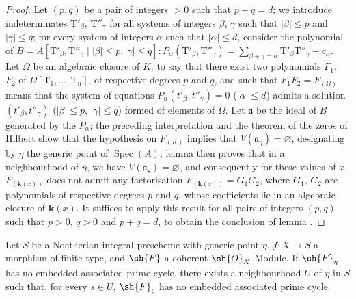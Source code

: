 \begin{proof}
Let $(p,q)$ be a pair of integers $>0$ such that $p+q=d$; we introduce indeterminates $\mathrm{T}'_\beta$, $\mathrm{T}''_\gamma$ for all systems of integers $\beta$, $\gamma$ such that $|\beta|\leqslant p$ and $|\gamma|\leqslant q$; for every system of integers $\alpha$ such that $|\alpha|\leqslant d$, consider the polynomial of $B=A[\mathrm{T}'_\beta, \mathrm{T}''_\gamma \mid |\beta|\leqslant p, |\gamma|\leqslant q]: P_\alpha(\mathrm{T}'_\beta,\mathrm{T}''_\gamma)=\sum_{\beta+\gamma=\alpha}\mathrm{T}'_\beta \mathrm{T}''_\gamma-c_\alpha$.
Let $\Omega$ be an algebraic closure of $K$; to say that there exist two polynomials $F_1$, $F_2$ of $\Omega[\mathrm{T}_1,\ldots,\mathrm{T}_n]$, of respective degrees $p$ and $q$, and such that $F_1 F_2=F_{(\Omega)}$ means that the system of equations $P_\alpha(t'_\beta,t''_\gamma)=0$ ($|\alpha|\leqslant d$) admits a solution $(t'_\beta,t''_\gamma)$ ($|\beta|\leqslant p$, $|\gamma|\leqslant q$) formed of elements of $\Omega$.
Let $\mathfrak{a}$ be the ideal of $B$ generated by the $P_\alpha$; the preceding interpretation and the theorem of the zeros of Hilbert show that the hypothesis on $F_{(K)}$ implies that $V(\mathfrak{a}_\eta)=\varnothing$, designating by $\eta$ the generic point of $\operatorname{Spec}(A)$; lemma  then proves that in a neighbourhood of $\eta$, we have $V(\mathfrak{a}_s)=\varnothing$, and consequently for these values of $x$, $F_{(\boldsymbol{k}(x))}$ does not admit any factorisation $F_{(\boldsymbol{k}(x))}=G_1 G_2$, where $G_1$, $G_2$ are polynomials of respective degrees $p$ and $q$, whose coefficients lie in an algebraic closure of $\boldsymbol{k}(x)$.
It suffices to apply this result for all pairs of integers $(p,q)$ such that $p>0$, $q>0$ and $p+q=d$, to obtain the conclusion of lemma .
\end{proof}

\begin{proposition}[9.7.6]
\label{IV.9.7.6}
Let $S$ be a Noetherian integral prescheme with generic point $\eta$, $f:X\to S$ a morphism of finite type, and $\sh{F}$ a coherent $\sh{O}_X$-Module.
If $\sh{F}_\eta$ has no embedded associated prime cycle, there exists a neighbourhood $U$ of $\eta$ in $S$ such that, for every $s\in U$, $\sh{F}_s$ has no embedded associated prime cycle.
\end{proposition}

